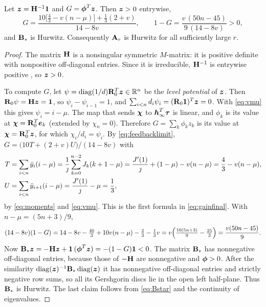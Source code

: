 \begin{lemma}\label{lem:gain}
Let \(\boldsymbol z=\mathbf H^{-1}\boldsymbol 1\) and \(G=\boldsymbol\phi^{T}\boldsymbol z\). Then \(\boldsymbol z>0\) entrywise,
\begin{equation}\label{eq:gainfinal}
 G=\frac{10\bigl[\tfrac43-v(n-\mu)\bigr]+\tfrac13(2+v)}{14-8v},\qquad
 1-G=\frac{v\,(50n-45)}{9\,(14-8v)}>0,
\end{equation}
and \(\mathbf B_*\) is Hurwitz. Consequently \(\mathbf A_r\) is Hurwitz for all sufficiently large \(r\).
\end{lemma}
\begin{proof}
The matrix \(\mathbf H\) is a nonsingular symmetric \(M\)-matrix: it is positive definite with
nonpositive off-diagonal entries. Since it is irreducible, \(\mathbf H^{-1}\) is entrywise positive
\cite[Ch.~6]{BermanPlemmons}, so \(\boldsymbol z>0\).

To compute \(G\), let \(\psi=\operatorname{diag}(1/d)\mathbf R_0^{T}\boldsymbol z\in\mathbb R^{n}\) be the \emph{level potential} of
\(\boldsymbol z\). Then \(\mathbf R_0\psi=\mathbf H\boldsymbol z=\boldsymbol 1\), so \(\psi_i-\psi_{i-1}=1\), and
\(\sum_{i<n}d_i\psi_i=(\mathbf R_0\boldsymbol 1)^{T}\boldsymbol z=0\). With \eqref{eq:vmu} this gives \(\psi_i=i-\mu\).
The map that sends \(\boldsymbol\chi\) to \(\boldsymbol h_\infty^{T}\boldsymbol\tau\) is linear, and \(\phi_k\) is its value
at \(\boldsymbol\chi=\mathbf R_0^{T}\boldsymbol e_k\) (extended by \(\chi_n=0\)). Therefore \(G=\sum_k\phi_kz_k\) is its
value at \(\boldsymbol\chi=\mathbf R_0^{T}\boldsymbol z\), for which \(\chi_i/d_i=\psi_i\). By \eqref{eq:feedbacklimit},
\(G=\bigl(10T+(2+v)U\bigr)/(14-8v)\) with
\begin{align*}
 T&=\sum_{i<n}\bar y_i(i-\mu)=\frac1{\jmath}\sum_{k=0}^{n-2}J_k(k+1-\mu)
   =\frac{J'(1)}{\jmath}+(1-\mu)-v(n-\mu)=\frac43-v(n-\mu),\\
 U&=\sum_{i<n}\bar y_{i+1}(i-\mu)=\frac{J'(1)}{\jmath}-\mu=\frac13,
\end{align*}
by \eqref{eq:moments} and \eqref{eq:vmu}. This is the first formula in \eqref{eq:gainfinal}. With
\(n-\mu=(5n+3)/9\),
\[
 (14-8v)(1-G)=14-8v-\tfrac{40}{3}+10v(n-\mu)-\tfrac23-\tfrac13v
 =v\Bigl(\tfrac{10(5n+3)}{9}-\tfrac{25}{3}\Bigr)=\frac{v(50n-45)}{9}.
\]
Now \(\mathbf B_*\boldsymbol z=-\mathbf H\boldsymbol z+\boldsymbol 1\,(\boldsymbol\phi^{T}\boldsymbol z)=-(1-G)\boldsymbol 1<0\). The matrix \(\mathbf B_*\) has nonnegative
off-diagonal entries, because those of \(-\mathbf H\) are nonnegative and \(\boldsymbol\phi>0\). After the
similarity \(\operatorname{diag}(\boldsymbol z)^{-1}\mathbf B_*\operatorname{diag}(\boldsymbol z)\) it has nonnegative off-diagonal entries and
strictly negative row sums, so all its Gershgorin discs lie in the open left half-plane. Thus
\(\mathbf B_*\) is Hurwitz. The last claim follows from \eqref{eq:Bstar} and the continuity of
eigenvalues.
\end{proof}

